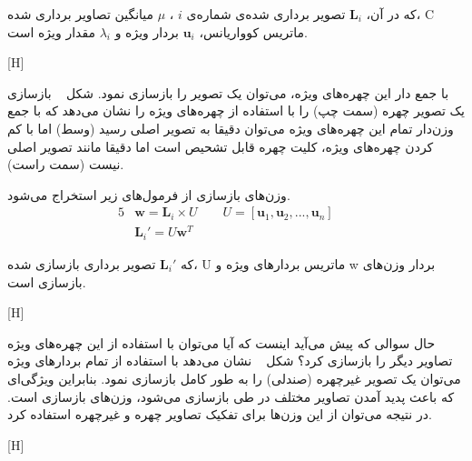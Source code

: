 که در آن، $\mathbf{L}_i$ تصویر برداری شده‌ی شماره‌ی $i$ ، $\mu$ میانگین تصاویر برداری شده، C ماتریس کوواریانس، $\mathbf{u}_i$ بردار ویژه و $\lambda_i$ مقدار ویژه است.

[H]

با جمع ‌‌دار این چهره‌های ویژه، می‌توان یک تصویر را بازسازی نمود. شکل ~ بازسازی یک تصویر چهره (سمت چپ) را با استفاده از چهره‌های ویژه را نشان می‌دهد که با جمع وزن‌دار تمام این چهره‌های ویژه می‌توان دقیقا به تصویر اصلی رسید (وسط) اما با کم کردن چهره‌های ویژه، کلیت چهره قابل تشحیص است اما دقیقا مانند تصویر اصلی نیست (سمت راست). 

وزن‌های بازسازی از فرمول‌های زیر استخراج می‌شود.
\begin{alignat}{5}
	&\mathbf{w} = \mathbf{L}_i \times U   \qquad  U = [\mathbf{u}_1, \mathbf{u}_2,..., \mathbf{u}_n] \label{recweight} && \\
	&\mathbf{L}_i' = U \mathbf{w}^T \label{recimg} && 
\end{alignat}

که $\mathbf{L}_i'$ تصویر برداری بازسازی شده، U ماتریس بردارهای ویژه و w بردار وزن‌های بازسازی است.

[H]

حال سوالی که پیش می‌آید اینست که آیا می‌توان با استفاده از این چهره‌های ویژه تصاویر دیگر را بازسازی کرد؟ شکل ~ نشان می‌دهد با استفاده از تمام بردارهای ویژه می‌توان یک تصویر غیرچهره (صندلی) را به طور کامل بازسازی نمود. بنابراین ویژگی‌ای که باعث پدید آمدن تصاویر مختلف در طی بازسازی می‌شود، وزن‌های بازسازی است. در نتیجه می‌توان از این وزن‌ها برای تفکیک تصاویر چهره و غیرچهره استفاده کرد.

[H]

